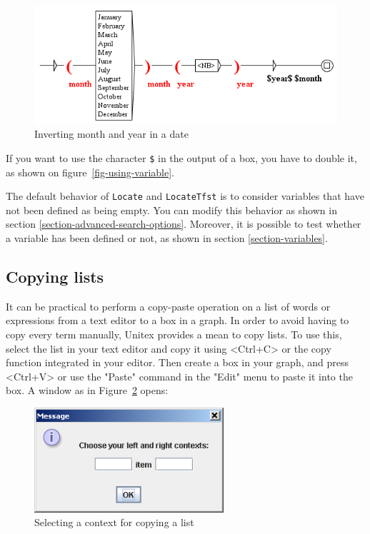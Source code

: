 \bigskip
\begin{figure}[h]
\begin{center}
\includegraphics[width=14.5cm]{resources/img/fig5-17.png}
\caption{Inverting month and year in a date\label{fig-date-grammar}}
\end{center}
\end{figure}

\noindent If you want to use the character \verb+$+ in the output of a box, you
have to double it, as shown on figure~\ref{fig-using-variable}.

\bigskip
\noindent The default behavior of \verb+Locate+ and \verb+LocateTfst+ is to
consider variables that have not been defined as being empty. You can
modify this behavior as shown in section \ref{section-advanced-search-options}.
Moreover, it is possible to test whether a variable has been defined or not, as
shown in section \ref{section-variables}.

\subsection{Copying lists}

It can be practical to perform a copy-paste operation on a list of words or
expressions from a text editor to a box in a graph. In order to avoid having to
copy every term manually, Unitex provides a mean to copy lists. To use this,
select the list in your text editor and copy it using <Ctrl+C> or the copy
function integrated in your editor. Then create a box in your graph, and press
<Ctrl+V> or use the "Paste" command in the "Edit" menu to paste it into the box.
A window as in Figure~\ref{fig-setting-contexts-for-multiple-copy}
opens:

\bigskip
\begin{figure}[h]
\begin{center}
\includegraphics[width=7cm]{resources/img/fig5-18.png}
\caption{Selecting a context for copying a list\label{fig-setting-contexts-for-multiple-copy}}
\end{center}
\end{figure}

